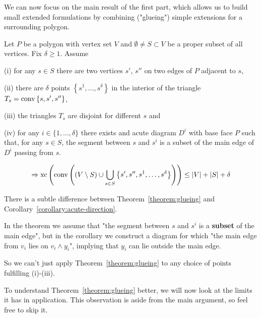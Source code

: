 We can now focus on the main result of the first part, which allows us to build small extended formulations by combining ("glueing") simple extensions for a surrounding polygon.

\begin{theorem}\label{theorem:glueing}
  Let $P$ be a polygon with vertex set $V$ and $\emptyset \neq S \subset V$ be a proper subset of all vertices. Fix $\delta \geq 1$. Assume

  (i) for any $s \in S$ there are two vertices $s'$, $s''$ on two edges of $P$ adjacent to $s$,

  (ii) there are $\delta$ points $\left\{s^1, \dots, s^\delta \right\}$ in the interior of the triangle ${T_s = \operatorname{conv} \left\{s,s',s''\right\}}$,
  
  (iii) the triangles $T_s$ are disjoint for different $s$ and

  (iv) for any $i \in \{1,\dots,\delta\}$ there exists and acute diagram $D^i$ with base face $P$ such that, for any $s \in S$, the segment between $s$ and $s^i$ is a subset of the main edge of $D^i$ passing from $s$. 
  
  $$\Rightarrow \operatorname{xc}\left( \operatorname{conv}\left( (V \setminus S) \cup \bigcup_{s \in S} \left\{ s',s'',s^1,\dots,s^\delta \right\}  \right) \right) \leq \lvert V\rvert + \lvert S\rvert + \delta$$
\end{theorem}

\begin{remark}\label{remark:pitfall}
  There is a subtle difference between Theorem~\ref{theorem:glueing} and Corollary~\ref{corollary:acute-direction}.

  In the theorem we assume that "the segment between $s$ and $s^i$ is a \textbf{subset} of the main edge", but in the corollary we construct a diagram for which "the main edge from $v_i$ lies on $v_i \wedge y_i$", implying that $y_i$ can lie outside the main edge. 

  So we can't just apply Theorem~\ref{theorem:glueing} to any choice of points fulfilling (i)-(iii).
\end{remark}

To understand Theorem~\ref{theorem:glueing} better, we will now look at the limits it has in application. This observation is aside from the main argument, so feel free to skip it.

